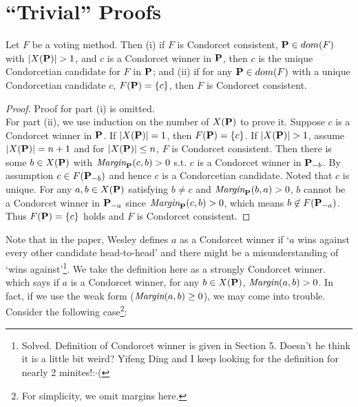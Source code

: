 \chapter{``Trivial'' Proofs}

\begin{lemma}
    Let $F$ be a voting method. Then (i) if $F$ is Condorcet consistent, $\mathbf{P} \in dom(F)$ with $|X(\mathbf{P})| > 1$, and $c$ is a Condorcet winner in $\mathbf{P}$, then $c$ is the unique Condorcetian candidate for $F$ in $\mathbf{P}$; and (ii) if for any $\mathbf{P} \in dom(F)$ with a unique Condorcetian candidate $c$, $F(\mathbf{P}) = \{c\}$, then $F$ is Condorcet consistent.
\end{lemma}

\begin{proof}
    Proof for part (i) is omitted.\\
    For part (ii), we use induction on the number of $X(\mathbf{P})$ to prove it. Suppose $c$ is a Condorcet winner in $\mathbf{P}$. If $|X(\mathbf{P})| = 1$, then $F(\mathbf{P}) = \{c\}$. If $|X(\mathbf{P})| > 1$, assume $|X(\mathbf{P})| = n+1$ and for $|X(\mathbf{P})| \leq n$, $F$ is Condorcet consistent. Then there is some $b \in X(\mathbf{P})$ with $\textit{Margin}_{\mathbf{P}}(c,b) > 0$ s.t. $c$ is a Condorcet winner in $\mathbf{P}_{-b}$. By assumption $c \in F(\mathbf{P}_{-b})$ and hence $c$ is a Condorcetian candidate. Noted that $c$ is unique. For any $a,b \in X(\mathbf{P})$ satisfying $b \neq c$ and $\textit{Margin}_{\mathbf{P}}(b,a) > 0$, $b$ cannot be a Condorcet winner in $\mathbf{P}_{-a}$ since $\textit{Margin}_{\mathbf{P}}(c,b)>0$, which means $b \not \in F(\mathbf{P}_{-a})$. Thus $F(\mathbf{P}) = \{c\}$ holds and $F$ is Condorcet consistent. 
\end{proof}

Note that in the paper, Wesley defines $a$ as a Condorcet winner if `$a$ wins against every other candidate head-to-head' and there might be a misunderstanding of `wins against'\footnote{Solved. Definition of Condorcet winner is given in Section 5. Doesn't he think it is a little bit weird? Yifeng Ding and I keep looking for the definition for nearly 2 minites!:$\cdot$(}. We take the definition here as a strongly Condorcet winner. which says if $a$ is a Condorcet winner, for any $b \in X(\mathbf{P})$, $\textit{Margin}(a,b) > 0$. In fact, if we use the weak form ($\textit{Margin}(a,b) \geq 0$), we may come into trouble. Consider the following case\footnote{For simplicity, we omit margins here.}:

\begin{center}
\end{center}

